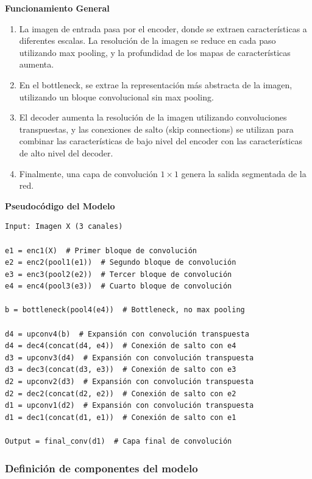 \textbf{Funcionamiento General}

\begin{enumerate}
    \item La imagen de entrada pasa por el encoder, donde se extraen características a diferentes escalas. La resolución de la imagen se reduce en cada paso utilizando max pooling, y la profundidad de los mapas de características aumenta.
    \item En el bottleneck, se extrae la representación más abstracta de la imagen, utilizando un bloque convolucional sin max pooling.
    \item El decoder aumenta la resolución de la imagen utilizando convoluciones transpuestas, y las conexiones de salto (skip connections) se utilizan para combinar las características de bajo nivel del encoder con las características de alto nivel del decoder.
    \item Finalmente, una capa de convolución $1 \times 1$ genera la salida segmentada de la red.
\end{enumerate}

\textbf{Pseudocódigo del Modelo}

\begin{verbatim}
Input: Imagen X (3 canales)

e1 = enc1(X)  # Primer bloque de convolución
e2 = enc2(pool1(e1))  # Segundo bloque de convolución
e3 = enc3(pool2(e2))  # Tercer bloque de convolución
e4 = enc4(pool3(e3))  # Cuarto bloque de convolución

b = bottleneck(pool4(e4))  # Bottleneck, no max pooling

d4 = upconv4(b)  # Expansión con convolución transpuesta
d4 = dec4(concat(d4, e4))  # Conexión de salto con e4
d3 = upconv3(d4)  # Expansión con convolución transpuesta
d3 = dec3(concat(d3, e3))  # Conexión de salto con e3
d2 = upconv2(d3)  # Expansión con convolución transpuesta
d2 = dec2(concat(d2, e2))  # Conexión de salto con e2
d1 = upconv1(d2)  # Expansión con convolución transpuesta
d1 = dec1(concat(d1, e1))  # Conexión de salto con e1

Output = final_conv(d1)  # Capa final de convolución
\end{verbatim}

\subsubsection{Definición de componentes del modelo}

